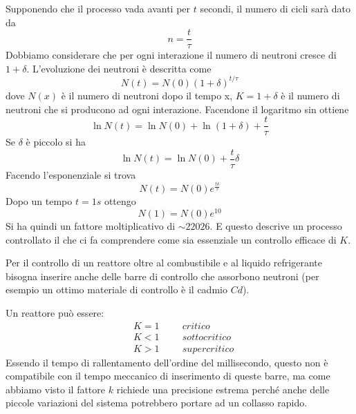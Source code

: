 Supponendo che il processo vada avanti per $t$ secondi, il numero di cicli sarà dato da 
\begin{equation}
n=\frac{t}{\tau}
\end{equation}
Dobbiamo considerare che per ogni interazione il numero di neutroni cresce di $1+\delta$.
L'evoluzione dei neutroni è descritta come
\begin{equation}
N(t)=N(0)(1+\delta)^{t/\tau}
\end{equation}
dove $N(x)$ è il numero di neutroni dopo il tempo x, $K=1+\delta$ è il numero di neutroni che si producono ad ogni interazione.
Facendone il logaritmo sin ottiene
\begin{equation}
\ln N(t)=\ln N(0)+\ln(1+\delta)+\frac{t}{\tau}
\end{equation}
Se $\delta$ è piccolo si ha
\begin{equation}
\ln N(t)=\ln N(0)+\frac{t}{\tau}\delta
\end{equation}
Facendo l'esponenziale si trova
\begin{equation}
N(t)=N(0)e^{\frac{t\delta}{\tau}}
\end{equation}
Dopo un tempo $t=1s$ ottengo 
\begin{equation}
N(1)=N(0)e^10
\end{equation}
Si ha quindi un fattore moltiplicativo di $\sim 22026$. E questo descrive un processo controllato il che ci fa comprendere come sia essenziale un controllo efficace di $K$.

Per il controllo  di un reattore oltre al combustibile e al liquido refrigerante bisogna inserire anche delle barre di controllo che assorbono neutroni (per esempio un ottimo materiale di controllo è il cadmio $Cd$).

Un reattore può essere:
\begin{equation}
\begin{split}
&K=1\hspace{1cm}critico\\
&K<1\hspace{1cm}sottocritico\\
&K>1\hspace{1cm}supercritico
\end{split}
\end{equation}
Essendo il tempo di rallentamento dell'ordine del millisecondo, questo non è compatibile con il tempo meccanico di inserimento di queste barre, ma come abbiamo visto il fattore $k$ richiede una precisione estrema perché anche delle piccole variazioni del sistema potrebbero portare ad un collasso rapido.


